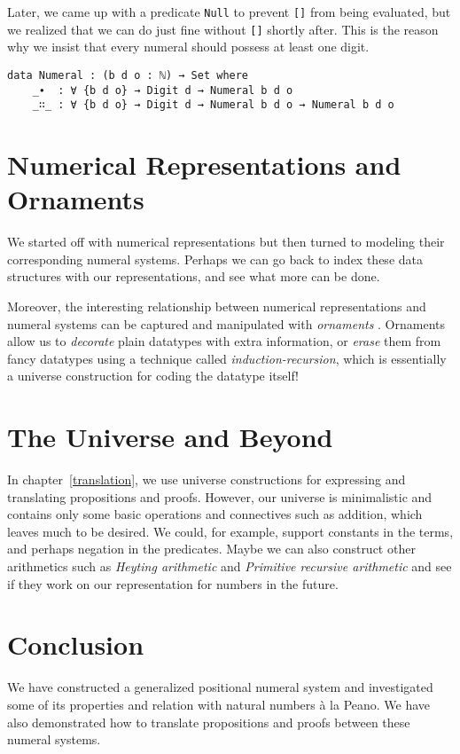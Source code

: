 \documentclass[\main/thesis.tex]{subfiles}
\begin{document}
Later, we came up with a predicate \lstinline|Null| to prevent \lstinline|[]|
from being evaluated, but we realized that we can do just fine without
\lstinline|[]| shortly after.
This is the reason why we insist that every numeral should possess at least one
digit.

\begin{lstlisting}
data Numeral : (b d o : ℕ) → Set where
    _∙  : ∀ {b d o} → Digit d → Numeral b d o
    _∷_ : ∀ {b d o} → Digit d → Numeral b d o → Numeral b d o
\end{lstlisting}

\section{Numerical Representations and Ornaments}

We started off with numerical representations but then turned to
modeling their corresponding numeral systems.
Perhaps we can go back to index these data structures with our representations,
and see what more can be done.

Moreover, the interesting relationship between numerical representations
and numeral systems can be captured and manipulated with \textit{ornaments}
\cite{mcbride2010ornamental}.
Ornaments allow us to \textit{decorate} plain datatypes with extra information,
or \textit{erase} them from fancy datatypes using a technique called
\textit{induction-recursion}\cite{dybjer1999finite}, which is essentially
a universe construction for coding the datatype itself!

\section{The Universe and Beyond}

In chapter~\ref{translation}, we use universe constructions for expressing and
translating propositions and proofs.
However, our universe is minimalistic and contains only some basic operations
and connectives such as addition, which leaves much to be desired.
We could, for example, support constants in the terms, and perhaps negation in
the predicates.
Maybe we can also construct other arithmetics such as
\textit{Heyting arithmetic} and \textit{Primitive recursive arithmetic}
and see if they work on our representation for numbers in the future.

\section{Conclusion}

We have constructed a generalized positional numeral system
and investigated some of its properties and relation with natural numbers à la
Peano.
We have also demonstrated how to translate propositions and proofs between these
numeral systems.
\end{document}
